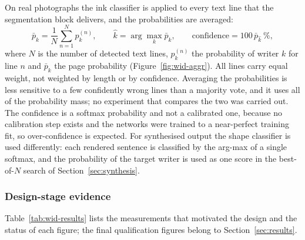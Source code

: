 On real photographs the ink classifier is applied to every text line that the segmentation block delivers, and the probabilities are averaged:
\begin{equation}
\bar p_k=\frac1N\sum_{n=1}^Np^{(n)}_k,\qquad\hat k=\arg\max_k\bar p_k,\qquad\text{confidence}=100\,\bar p_{\hat k}\ \%,
\label{eq:wid-aggr}
\end{equation}
where $N$ is the number of detected text lines, $p^{(n)}_k$ the probability of writer $k$ for line $n$ and $\bar p_k$ the page probability (Figure~\ref{fig:wid-aggr}).
All lines carry equal weight, not weighted by length or by confidence.
Averaging the probabilities is less sensitive to a few confidently wrong lines than a majority vote, and it uses all of the probability mass; no experiment that compares the two was carried out.
The confidence is a softmax probability and not a calibrated one, because no calibration step exists and the networks were trained to a near-perfect training fit, so over-confidence is expected.
For synthesised output the shape classifier is used differently: each rendered sentence is classified by the arg-max of a single softmax, and the probability of the target writer is used as one score in the best-of-$N$ search of Section~\ref{sec:synthesis}.


\subsubsection{Design-stage evidence}

Table~\ref{tab:wid-results} lists the measurements that motivated the design and the status of each figure; the final qualification figures belong to Section~\ref{sec:results}.

